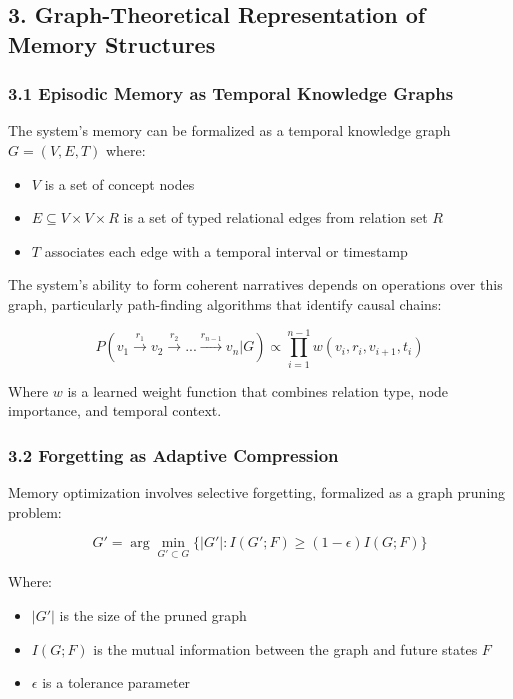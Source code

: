 \documentclass[
]{article}
\providecommand{\tightlist}{%
  \setlength{\itemsep}{0pt}\setlength{\parskip}{0pt}}
\begin{document}
\subsection{3. Graph-Theoretical Representation of Memory
Structures}\label{graph-theoretical-representation-of-memory-structures}

\subsubsection{3.1 Episodic Memory as Temporal Knowledge
Graphs}\label{episodic-memory-as-temporal-knowledge-graphs}

The system's memory can be formalized as a temporal knowledge graph
\(G = (V, E, T)\) where:

\begin{itemize}
\tightlist
\item
  \(V\) is a set of concept nodes
\item
  \(E \subseteq V \times V \times R\) is a set of typed relational edges
  from relation set \(R\)
\item
  \(T\) associates each edge with a temporal interval or timestamp
\end{itemize}

The system's ability to form coherent narratives depends on operations
over this graph, particularly path-finding algorithms that identify
causal chains:

\[P(v_1 \xrightarrow{r_1} v_2 \xrightarrow{r_2} ... \xrightarrow{r_{n-1}} v_n | G) \propto \prod_{i=1}^{n-1} w(v_i, r_i, v_{i+1}, t_i)\]

Where \(w\) is a learned weight function that combines relation type,
node importance, and temporal context.

\subsubsection{3.2 Forgetting as Adaptive
Compression}\label{forgetting-as-adaptive-compression}

Memory optimization involves selective forgetting, formalized as a graph
pruning problem:

\[G' = \arg\min_{G' \subset G} \{|G'| : I(G'; F) \geq (1-\epsilon)I(G; F)\}\]

Where:

\begin{itemize}
\tightlist
\item
  \(|G'|\) is the size of the pruned graph
\item
  \(I(G; F)\) is the mutual information between the graph and future
  states \(F\)
\item
  \(\epsilon\) is a tolerance parameter
\end{itemize}
\end{document}
